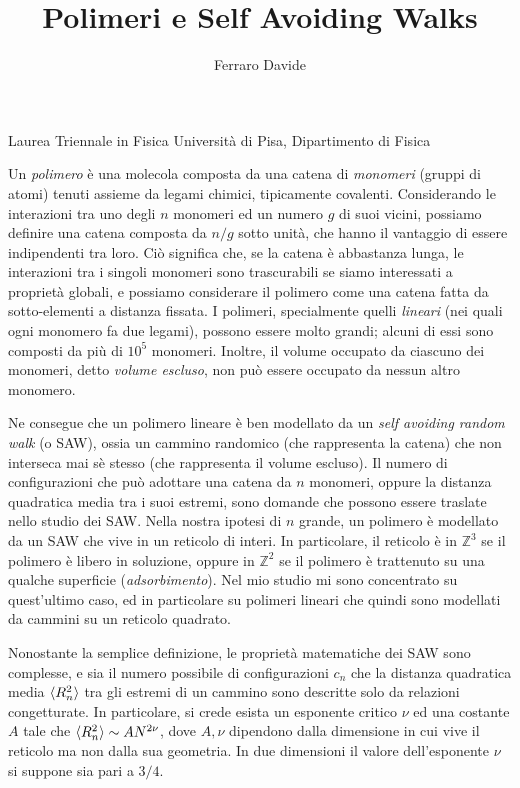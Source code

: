 \documentclass[12pt]{article}
\begin{document}
\date{}
\author{Ferraro Davide}
\title{\textbf{Polimeri e Self Avoiding Walks}}
\maketitle
\begin{center}
Laurea Triennale in Fisica \linebreak
Università di Pisa, Dipartimento di Fisica
\end{center}
Un \textit{polimero} è una molecola composta da una catena di \textit{monomeri} (gruppi di atomi) tenuti assieme da legami chimici, tipicamente covalenti. Considerando le interazioni tra uno degli $n$ monomeri ed un numero $g$ di suoi vicini, possiamo definire una catena composta da $n/g$ sotto unità, che hanno il vantaggio di essere indipendenti tra loro. Ciò significa che, se la catena è abbastanza lunga, le interazioni tra i singoli monomeri sono trascurabili se siamo interessati a proprietà globali, e possiamo considerare il polimero come una catena fatta da sotto-elementi a distanza fissata.
I polimeri, specialmente quelli \textit{lineari} (nei quali ogni monomero fa due legami), possono essere molto grandi; alcuni di essi sono composti da più di $10^5$ monomeri. Inoltre, il volume occupato da ciascuno dei monomeri, detto \textit{volume escluso}, non può essere occupato da nessun altro monomero.

Ne consegue che un polimero lineare è ben modellato da un \textit{self avoiding random walk} (o SAW), ossia un cammino randomico (che rappresenta la catena) che non interseca mai sè stesso (che rappresenta il volume escluso). Il numero di configurazioni che può adottare una catena da $n$ monomeri, oppure la distanza quadratica media tra i suoi estremi, sono domande che possono essere traslate nello studio dei SAW. Nella nostra ipotesi di $n$ grande, un polimero è modellato da un SAW che vive in un reticolo di interi. In particolare, il reticolo è in $\mathbb{Z}^3$ se il polimero è libero in soluzione, oppure in $\mathbb{Z}^2$ se il polimero è trattenuto su una qualche superficie (\textit{adsorbimento}). Nel mio studio mi sono concentrato su quest'ultimo caso, ed in particolare su polimeri lineari che quindi sono modellati da cammini su un reticolo quadrato.

Nonostante la semplice definizione, le proprietà matematiche dei SAW sono complesse, e sia il numero possibile di configurazioni $c_n$ che la distanza quadratica media $\braket{R_n^2}$ tra gli estremi di un cammino sono descritte solo da relazioni congetturate. In particolare, si crede esista un esponente critico $\nu$ ed una costante $A$ tale che $\braket{R^2_n}\sim AN^{2\nu}$, dove $A,\nu$ dipendono dalla dimensione in cui vive il reticolo ma non dalla sua geometria. In due dimensioni il valore dell'esponente $\nu$ si suppone sia pari a $3/4$.
\end{document}
